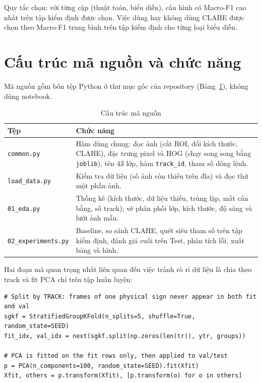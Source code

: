Quy tắc chọn: với từng cặp (thuật toán, biểu diễn), cấu hình có Macro-F1 cao nhất trên tập kiểm định được chọn. Việc dùng hay không dùng CLAHE được chọn theo Macro-F1 trung bình trên tập kiểm định cho từng loại biểu diễn.

\section{Cấu trúc mã nguồn và chức năng}

Mã nguồn gồm bốn tệp Python ở thư mục gốc của repository (Bảng~\ref{tab:ma-nguon}), không dùng notebook.

\begin{table}[H]
\centering
\caption{Cấu trúc mã nguồn}
\label{tab:ma-nguon}
\begin{tabular}{|p{3.6cm}|p{11.4cm}|}
\hline
\textbf{Tệp} & \textbf{Chức năng} \\
\hline
\texttt{common.py} & Hàm dùng chung: đọc ảnh (cắt ROI, đổi kích thước, CLAHE), đặc trưng pixel và HOG (chạy song song bằng \texttt{joblib}), tên 43 lớp, hàm \texttt{track\_id}, tham số dòng lệnh. \\
\hline
\texttt{load\_data.py} & Kiểm tra dữ liệu (số ảnh còn thiếu trên đĩa) và đọc thử một phần ảnh. \\
\hline
\texttt{01\_eda.py} & Thống kê (kích thước, dữ liệu thiếu, trùng lặp, mất cân bằng, số track); vẽ phân phối lớp, kích thước, độ sáng và lưới ảnh mẫu. \\
\hline
\texttt{02\_experiments.py} & Baseline, so sánh CLAHE, quét siêu tham số trên tập kiểm định, đánh giá cuối trên Test, phân tích lỗi, xuất bảng và hình. \\
\hline
\end{tabular}
\end{table}

Hai đoạn mã quan trọng nhất liên quan đến việc tránh rò rỉ dữ liệu là chia theo track và fit PCA chỉ trên tập huấn luyện:

{\footnotesize
\begin{verbatim}
# Split by TRACK: frames of one physical sign never appear in both fit and val
sgkf = StratifiedGroupKFold(n_splits=5, shuffle=True, random_state=SEED)
fit_idx, val_idx = next(sgkf.split(np.zeros(len(tr)), ytr, groups))

# PCA is fitted on the fit rows only, then applied to val/test
p = PCA(n_components=100, random_state=SEED).fit(Xfit)
Xfit, others = p.transform(Xfit), [p.transform(o) for o in others]
\end{verbatim}
}

